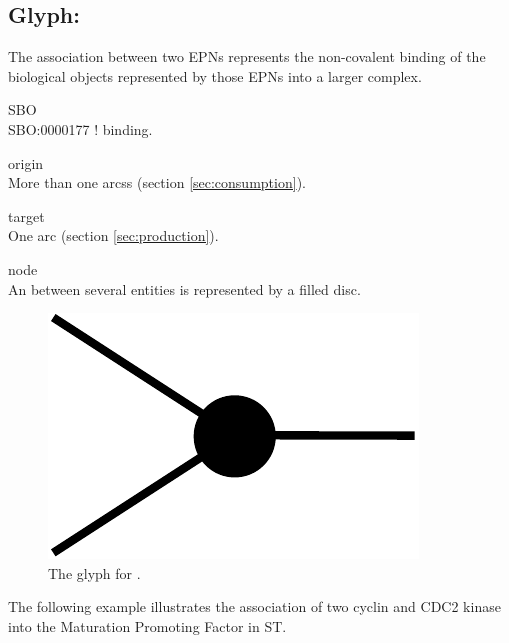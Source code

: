 \subsection{Glyph: }\label{sec:association}

The association between two EPNs represents the non-covalent binding of the biological objects represented by those EPNs into a larger complex.

\begin{glyphDescription}
 \item[SBO]\mbox{}\\ SBO:0000177 ! binding.
 \item[origin]\mbox{}\\ More than one  arcss (section \ref{sec:consumption}).
 \item[target]\mbox{}\\  One  arc (section \ref{sec:production}).
 \item[node]\mbox{}\\ An  between several entities is represented by a filled disc.
 \end{glyphDescription}

\begin{figure}[H]
  \centering
  \includegraphics[scale = 0.5]{images/association}
  \caption{The \PD glyph for .}
  \label{fig:association}
\end{figure}

The following example illustrates the association of two cyclin and CDC2 kinase into the Maturation Promoting Factor in ST.

